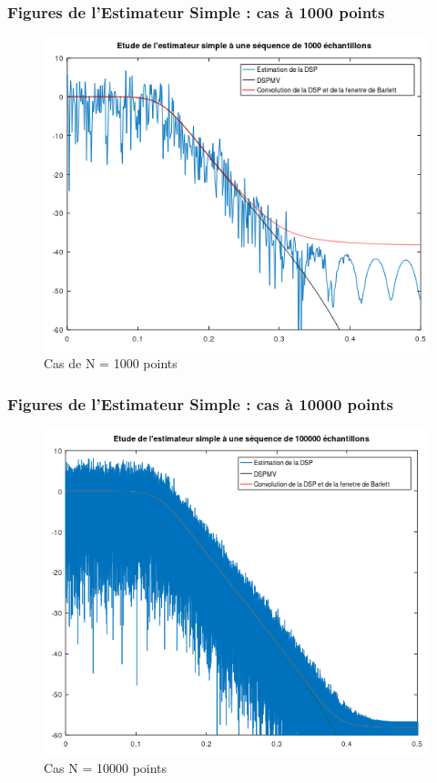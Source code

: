 \documentclass{article}
\begin{document}
\subsubsection{Figures de l'Estimateur Simple : cas à 1000 points}
\begin{figure}[h]
\centerline{\includegraphics[width=1\textwidth]{images/casESN1000.png}}
\caption{Cas de N = 1000 points}
\end{figure}
\newpage
\subsubsection{Figures de l'Estimateur Simple : cas à 10000 points}
\begin{figure}[h]
\centerline{\includegraphics[width=1\textwidth]{images/casESN100000.png}}
\caption{Cas N = 10000 points }
\end{figure}
\newpage
\end{document}
